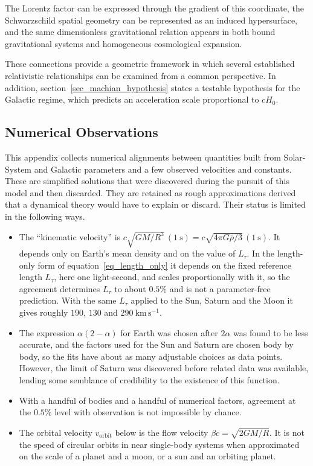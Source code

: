 \documentclass[pdflatex,sn-mathphys-num]{sn-jnl}%
\theoremstyle{thmstyleone}%
\theoremstyle{thmstyletwo}%
\theoremstyle{thmstylethree}%
\begin{document}
The Lorentz factor can be expressed through the gradient of this coordinate, the Schwarzschild spatial geometry can be represented as an induced hypersurface, and the same dimensionless gravitational relation appears in both bound gravitational systems and homogeneous cosmological expansion.

These connections provide a geometric framework in which several established relativistic relationships can be examined from a common perspective. In addition, section~\ref{sec_machian_hypothesis} states a testable hypothesis for the Galactic regime, which predicts an acceleration scale proportional to $cH_0$.


\begin{appendices}

\section{Numerical Observations}\label{sec_numerical_correlations}

This appendix collects numerical alignments between quantities built from Solar-System and Galactic parameters and a few observed velocities and constants. These are simplified solutions that were discovered during the pursuit of this model and then discarded. They are retained as rough approximations derived that a dynamical theory would have to explain or discard. Their status is limited in the following ways.

\begin{itemize}
\item The ``kinematic velocity'' is $c\sqrt{GM/R^3}\,(1~\mathrm{s})=c\sqrt{4\pi G\bar\rho/3}\,(1~\mathrm{s})$. It depends only on Earth's mean density and on the value of $L_\tau$. In the length-only form of equation~\eqref{eq_length_only} it depends on the fixed reference length $L_\tau$, here one light-second, and scales proportionally with it, so the agreement determines $L_\tau$ to about $0.5\%$ and is not a parameter-free prediction. With the same $L_\tau$ applied to the Sun, Saturn and the Moon it gives roughly $190$, $130$ and $290~\mathrm{km\,s^{-1}}$.
\item The expression $\alpha(2-\alpha)$ for Earth was chosen after $2\alpha$ was found to be less accurate, and the factors used for the Sun and Saturn are chosen body by body, so the fits have about as many adjustable choices as data points. However, the limit of Saturn was discovered before related data was available, lending some semblance of credibility to the existence of this function.
\item With a handful of bodies and a handful of numerical factors, agreement at the $0.5\%$ level with observation is not impossible by chance.
\item The orbital velocity $v_{\mathrm{orbit}}$ below is the flow velocity $\beta c=\sqrt{2GM/R}$. It is not the speed of circular orbits in near single-body systems when approximated on the scale of a planet and a moon, or a sun and an orbiting planet. 
\end{itemize}



\end{appendices}
\end{document}
